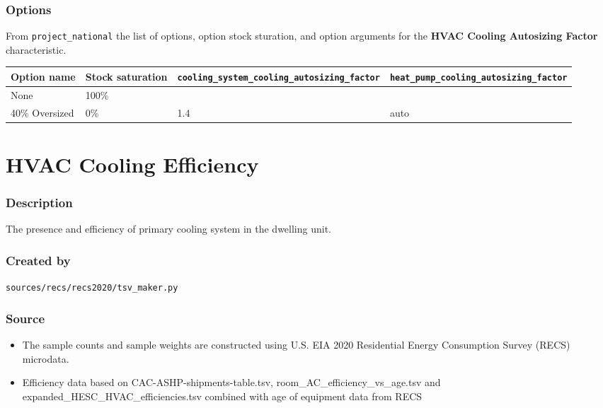 \subsubsection{Options}\label{options-63}

From \texttt{project\_national} the list of options, option stock
sturation, and option arguments for the \textbf{HVAC Cooling Autosizing
Factor} characteristic.

\begin{longtable}[]{@{}llll@{}}
\toprule\noalign{}
Option name & Stock saturation &
\texttt{cooling\_system\_cooling\_autosizing\_factor} &
\texttt{heat\_pump\_cooling\_autosizing\_factor} \\
\midrule\noalign{}
\endhead
\bottomrule\noalign{}
\endlastfoot
None & 100\% & & \\
40\% Oversized & 0\% & 1.4 & auto \\
\end{longtable}

\section{HVAC Cooling Efficiency}\label{hvac_cooling_efficiency}

\subsubsection{Description}\label{description-64}

The presence and efficiency of primary cooling system in the dwelling
unit.

\subsubsection{Created by}\label{created-by-64}

\texttt{sources/recs/recs2020/tsv\_maker.py}

\subsubsection{Source}\label{source-63}

\begin{itemize}
 
\item
  The sample counts and sample weights are constructed using U.S. EIA
  2020 Residential Energy Consumption Survey (RECS) microdata.
\item
  Efficiency data based on CAC-ASHP-shipments-table.tsv,
  room\_AC\_efficiency\_vs\_age.tsv and
  expanded\_HESC\_HVAC\_efficiencies.tsv combined with age of equipment
  data from RECS
\end{itemize}

